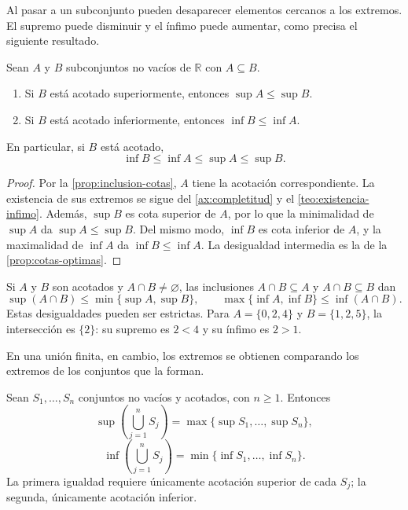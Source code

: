 Al pasar a un subconjunto pueden desaparecer elementos cercanos a los extremos. El supremo puede disminuir y el ínfimo puede aumentar, como precisa el siguiente resultado.

\begin{samepage}
\begin{proposition}
\label{prop:inclusion-extremos}
Sean $A$ y $B$ subconjuntos no vacíos de $\mathbb{R}$ con $A\subseteq B$.
\begin{enumerate}
    \item Si $B$ está acotado superiormente, entonces $\sup A\leq\sup B$.
    \item Si $B$ está acotado inferiormente, entonces $\inf B\leq\inf A$.
\end{enumerate}
En particular, si $B$ está acotado,
\[
 \inf B\leq\inf A\leq\sup A\leq\sup B.
\]
\end{proposition}
\end{samepage}

\begin{proof}
Por la \cref{prop:inclusion-cotas}, $A$ tiene la acotación correspondiente. La existencia de sus extremos se sigue del \cref{ax:completitud} y el \cref{teo:existencia-infimo}. Además, $\sup B$ es cota superior de $A$, por lo que la minimalidad de $\sup A$ da $\sup A\leq\sup B$. Del mismo modo, $\inf B$ es cota inferior de $A$, y la maximalidad de $\inf A$ da $\inf B\leq\inf A$. La desigualdad intermedia es la de la \cref{prop:cotas-optimas}.
\end{proof}

\begin{remark}[Intersecciones]
Si $A$ y $B$ son acotados y $A\cap B\neq\varnothing$, las inclusiones $A\cap B\subseteq A$ y $A\cap B\subseteq B$ dan
\[
 \sup(A\cap B)\leq\min\{\sup A,\sup B\},
 \qquad
 \max\{\inf A,\inf B\}\leq\inf(A\cap B).
\]
Estas desigualdades pueden ser estrictas. Para $A=\{0,2,4\}$ y $B=\{1,2,5\}$, la intersección es $\{2\}$: su supremo es $2<4$ y su ínfimo es $2>1$.
\end{remark}

En una unión finita, en cambio, los extremos se obtienen comparando los extremos de los conjuntos que la forman.

\begin{samepage}
\begin{proposition}
\label{prop:union-extremos}
Sean $S_1,\ldots,S_n$ conjuntos no vacíos y acotados, con $n\geq1$. Entonces
\[
 \sup\left(\bigcup_{j=1}^{n}S_j\right)
 =\max\{\sup S_1,\ldots,\sup S_n\},
\]
\[
 \inf\left(\bigcup_{j=1}^{n}S_j\right)
 =\min\{\inf S_1,\ldots,\inf S_n\}.
\]
La primera igualdad requiere únicamente acotación superior de cada $S_j$; la segunda, únicamente acotación inferior.
\end{proposition}
\end{samepage}

